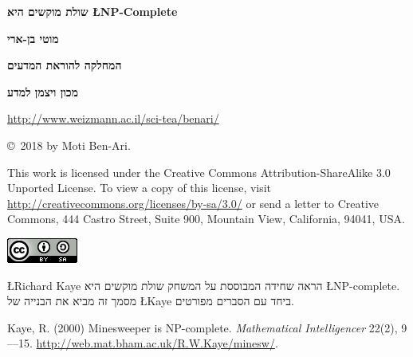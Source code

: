 \documentclass[12pt,a4paper]{article}
\begin{document}
\thispagestyle{empty}


\begin{center}
\textbf{\Huge שולת מוקשים היא
\L{NP-Complete}}

\bigskip
\bigskip

\textbf{\Large מוטי בן-ארי}

\bigskip

\textbf{\Large המחלקה להוראת המדעים}

\bigskip

\textbf{\Large מכון ויצמן למדע}

\bigskip

\url{http://www.weizmann.ac.il/sci-tea/benari/}

\bigskip

\end{center}


\begin{center}
\copyright{}\  2018 by Moti Ben-Ari.
\end{center}

\begin{footnotesize}
This work is licensed under the Creative Commons Attribution-ShareAlike 3.0 Unported License. To view a copy of this license, visit \url{http://creativecommons.org/licenses/by-sa/3.0/} or send a letter to Creative Commons, 444 Castro Street, Suite 900, Mountain View, California, 94041, USA.
\end{footnotesize}

\bigskip

\begin{center}
\includegraphics[width=.2\textwidth]{../by-sa.png}
\end{center}

\bigskip

\newpage

\L{Richard Kaye}
הראה שחידה המבוססת על המשחק שולת מוקשים היא
\L{NP-complete}.
מסמך זה מביא את הבנייה של 
\L{Kaye}
ביחד עם הסברים מפורטים.

Kaye, R. (2000) Minesweeper is NP-complete. \textit{Mathematical Intelligencer} 22(2), 9—15. \url{http://web.mat.bham.ac.uk/R.W.Kaye/minesw/}.

\end{document}
